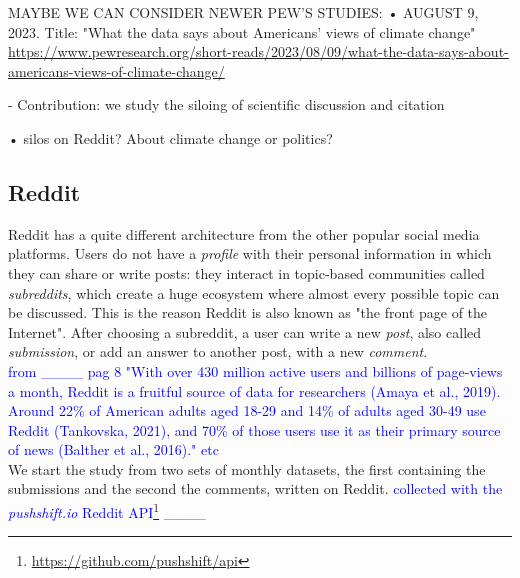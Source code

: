 \begin{itemize}
MAYBE WE CAN CONSIDER NEWER PEW'S STUDIES:
• AUGUST 9, 2023. Title: "What the data says about Americans’ views of climate change" \url{https://www.pewresearch.org/short-reads/2023/08/09/what-the-data-says-about-americans-views-of-climate-change/} 


- Contribution: we study the siloing of scientific discussion and citation

• silos on Reddit? About climate change or politics?

\end{itemize}









\subsection{Reddit}
Reddit has a quite different architecture from the other popular social media platforms. Users do not have a \emph{profile} with their personal information in which they can share or write posts: they interact in topic-based communities called \emph{subreddits}, which create a huge ecosystem where almost every possible topic can be discussed. This is the reason Reddit is also known as "the front page of the Internet". After choosing a subreddit, a user can write a new  \emph{post}, also called \emph{submission}, or add an answer to another post, with a new \emph{comment}. \\

\textcolor{blue}{from ____ pag 8 
"With over 430 million active users and billions of page-views a month, Reddit is a fruitful source of data for researchers (Amaya et al., 2019). Around 22\% of American adults aged 18-29 and 14\% of adults aged 30-49 use Reddit (Tankovska, 2021), and 70\% of those users use it as their primary source of news (Balther et al., 2016)." etc}\\


We start the study from two sets of monthly datasets, the first containing the submissions and the second the comments, written on Reddit. \textcolor{blue}{collected with the  \emph{pushshift.io} Reddit API\footnote{\url{https://github.com/pushshift/api}} ____}  



